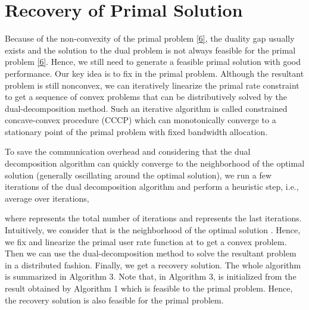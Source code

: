 \documentclass[12pt,onecolumn,tworows]{IEEEtran}
\begin{document}
\section{Recovery of Primal Solution }
Because of the non-convexity of the primal problem \eqref{6}, the duality gap usually exists and the solution to the dual problem  is not always feasible for the primal problem \eqref{6}. Hence, we still need to generate a feasible primal solution with good performance. Our key idea is to fix  in the primal problem. Although the resultant problem is still nonconvex, we can iteratively linearize the primal rate constraint to get a sequence of convex problems that can be distributively solved by the dual-decomposition method. Such an iterative algorithm is called constrained concave-convex procedure (CCCP)\cite{CCCP_convergence} which can monotonically converge to a stationary point of the primal problem with fixed bandwidth allocation.

To save the communication overhead and considering that the dual decomposition algorithm can quickly converge to the neighborhood of the optimal solution (generally oscillating around the optimal solution), we run a few iterations of the dual decomposition algorithm and perform a heuristic step, i.e., average  over iterations,

where  represents the total number of iterations and  represents the last  iterations. Intuitively, we consider that  is the neighborhood of the optimal solution . Hence, we fix  and linearize the primal user rate function  at  to get a convex problem. Then we can use the dual-decomposition method to solve the resultant problem in a distributed fashion. Finally, we get a recovery solution. The whole algorithm is summarized in Algorithm 3. Note that, in Algorithm 3,  is initialized from the result obtained by Algorithm 1 which is feasible to the primal problem. Hence, the recovery solution is also feasible for the primal problem\cite{CCCP_convergence}.
\end{document}
